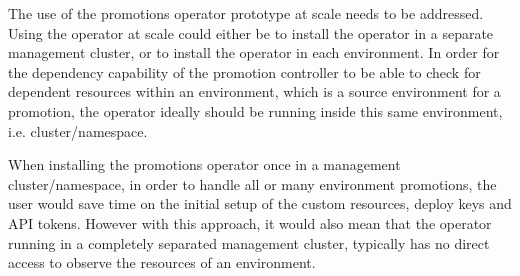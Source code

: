 The use of the promotions operator prototype at scale needs to be addressed.
Using the operator at scale could either be to install the operator in a separate management cluster,
or to install the operator in each environment.
In order for the dependency capability of the promotion controller
to be able to check for dependent resources within an environment,
which is a source environment for a promotion,
the operator ideally should be running inside this same environment, i.e. cluster/namespace.

When installing the promotions operator once in a management cluster/namespace,
in order to handle all or many environment promotions,
the user would save time on the initial setup of the custom resources, deploy keys and API tokens.
However with this approach, it would also mean that the operator running in a completely separated management cluster, typically has no direct access to observe the resources of an environment.




































